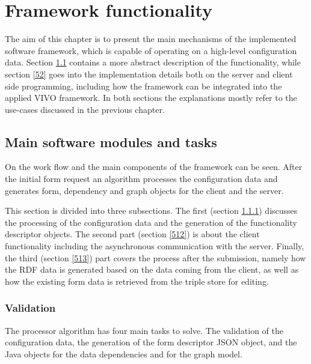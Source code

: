
\chapter{Framework functionality} \label{5}

The aim of this chapter is to present the main mechanisms of the implemented software framework, which is capable of operating on a high-level configuration data. Section \ref{51} contains a more abstract description of the functionality, while section \ref{52} goes into the implementation details both on the server and client side programming, including how the framework can be integrated into the applied VIVO framework. In both sections the explanations mostly refer to the use-cases discussed in the previous chapter.

\section{Main software modules and tasks} \label{51}

On  the work flow and the main components of the framework can be seen. After the initial form request an algorithm processes the configuration data and generates form, dependency and graph objects for the client and the server.


This section is divided into three subsections. The first (section \ref{511}) discusses the  processing of the configuration data and the generation of the functionality descriptor objects. The second part (section \ref{512}) is about the client functionality including the asynchronous communication with the server. Finally, the third (section \ref{513}) part covers the process after the submission, namely how the RDF data is generated based on the data coming from the client, as well as how the existing form data is retrieved from the triple store for editing.

\subsection{Validation} \label{511}

The processor algorithm has four main tasks to solve. The validation of the configuration data, the generation of the form descriptor JSON object, and the Java objects for the data dependencies and for the graph model. 


